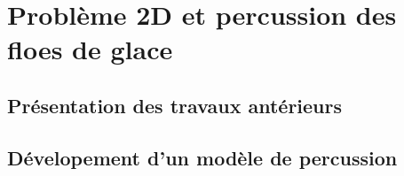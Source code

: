 
\chapter{Problème 2D et percussion des floes de glace} %

\label{Chapter5} %








\section{Présentation des travaux antérieurs}






















\section{Dévelopement d'un modèle de percussion}













